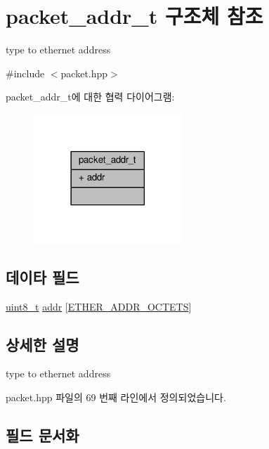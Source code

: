 \hypertarget{structpacket__addr__t}{}\section{packet\+\_\+addr\+\_\+t 구조체 참조}
\label{structpacket__addr__t}


type to ethernet address  




{\ttfamily \#include $<$packet.\+hpp$>$}



packet\+\_\+addr\+\_\+t에 대한 협력 다이어그램\+:
\nopagebreak
\begin{figure}[H]
\begin{center}
\leavevmode
\includegraphics[width=158pt]{structpacket__addr__t__coll__graph}
\end{center}
\end{figure}
\subsection*{데이타 필드}
\begin{DoxyCompactItemize}
\item 
\hyperlink{stdint_8h_aba7bc1797add20fe3efdf37ced1182c5}{uint8\+\_\+t} \hyperlink{structpacket__addr__t_ab8af51bba340e97aebc45b9c943fb17c}{addr} \mbox{[}\hyperlink{packet_8hpp_ab81d402a4929723091a6731508845125}{E\+T\+H\+E\+R\+\_\+\+A\+D\+D\+R\+\_\+\+O\+C\+T\+E\+TS}\mbox{]}
\end{DoxyCompactItemize}


\subsection{상세한 설명}
type to ethernet address 

packet.\+hpp 파일의 69 번째 라인에서 정의되었습니다.



\subsection{필드 문서화}
